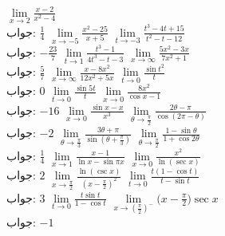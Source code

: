 $\lim\limits_{x\to 2}\frac{x-2}{x^2-4}$\\
جواب:\quad
$\tfrac{1}{4}$
$\lim\limits_{x\to -5}\frac{x^2-25}{x+5}$
$\lim\limits_{t\to-3}\frac{t^3-4t+15}{t^2-t-12}$\\
جواب:\quad
$-\tfrac{23}{7}$
$\lim\limits_{t\to 1}\frac{t^3-1}{4t^3-t-3}$
$\lim\limits_{x\to\infty}\frac{5x^2-3x}{7x^2+1}$\\
جواب:\quad
$\tfrac{5}{7}$
$\lim\limits_{x\to\infty}\frac{x-8x^2}{12x^2+5x}$
$\lim\limits_{t\to 0}\frac{\sin t^2}{t}$\\
جواب:\quad
$0$
$\lim\limits_{t\to 0}\frac{\sin 5t}{t}$
$\lim\limits_{x\to 0}\frac{8x^2}{\cos x-1}$\\
جواب:\quad
$-16$
$\lim\limits_{x\to 0}\frac{\sin x-x}{x^3}$
$\lim\limits_{\theta\to\tfrac{\pi}{2}}\frac{2\theta-\pi}{\cos(2\pi-\theta)}$\\
جواب:\quad
$-2$
$\lim\limits_{\theta\to\tfrac{\pi}{3}}\frac{3\theta+\pi}{\sin(\theta+\tfrac{\pi}{3})}$
$\lim\limits_{\theta\to\tfrac{\pi}{2}}\frac{1-\sin\theta}{1+\cos2\theta}$\\
جواب:\quad
$\tfrac{1}{4}$
$\lim\limits_{x\to 1}\frac{x-1}{\ln x-\sin \pi x}$
$\lim\limits_{x\to 0}\frac{x^2}{\ln(\sec x)}$\\
جواب:\quad
$2$
$\lim\limits_{x\to \tfrac{\pi}{2}}\frac{\ln(\csc x)}{(x-\tfrac{\pi}{2})^2}$
$\lim\limits_{t\to 0}\frac{t(1-\cos t)}{t-\sin t}$\\
جواب:\quad
$3$
$\lim\limits_{t\to 0}\frac{t\sin t}{1-\cos t}$
$\lim\limits_{x\to (\tfrac{\pi}{2})^-}\big(x-\frac{\pi}{2}\big)\sec x$\\
جواب:\quad
$-1$
